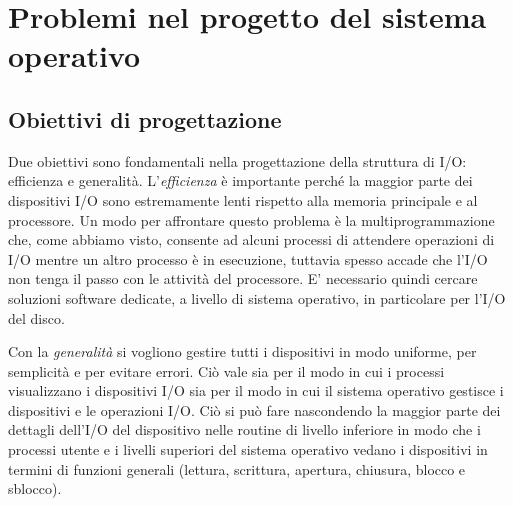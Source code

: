 \section{Problemi nel progetto del sistema operativo}
\subsection*{Obiettivi di progettazione}
Due obiettivi sono fondamentali nella progettazione della struttura di I/O: efficienza e generalità. L'\textit{efficienza} è importante perché la maggior parte dei dispositivi I/O sono estremamente lenti rispetto alla memoria principale e al processore. Un modo per affrontare questo problema è la multiprogrammazione che, come abbiamo visto, consente ad alcuni processi di attendere operazioni di I/O mentre un altro processo è in esecuzione, tuttavia spesso accade che l'I/O non tenga il passo con le attività del processore. E' necessario quindi cercare soluzioni software dedicate, a livello di sistema operativo, in particolare per l'I/O del disco.

Con la \textit{generalità} si vogliono gestire tutti i dispositivi in modo uniforme, per semplicità e per evitare errori. Ciò vale sia per il modo in cui i processi visualizzano i dispositivi I/O sia per il modo in cui il sistema operativo gestisce i dispositivi e le operazioni I/O. Ciò si può fare nascondendo la maggior parte dei dettagli dell'I/O del dispositivo nelle routine di livello inferiore in modo che i processi utente e i livelli superiori del sistema operativo vedano i dispositivi in termini di funzioni generali (lettura, scrittura, apertura, chiusura, blocco e sblocco).

